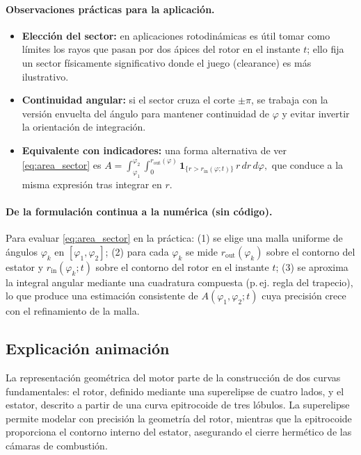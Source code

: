 \documentclass{LS}
\begin{document}
\paragraph{Observaciones prácticas para la aplicación.}
\begin{itemize}
  \item \textbf{Elección del sector:} en aplicaciones rotodinámicas es útil tomar como límites los rayos que pasan por dos ápices del rotor en el instante $t$; ello fija un sector físicamente significativo donde el juego (clearance) es más ilustrativo.
  \item \textbf{Continuidad angular:} si el sector cruza el corte $\pm\pi$, se trabaja con la versión envuelta del ángulo para mantener continuidad de $\varphi$ y evitar invertir la orientación de integración.
  \item \textbf{Equivalente con indicadores:} una forma alternativa de ver \eqref{eq:area_sector} es
  \(
  A=\int_{\varphi_1}^{\varphi_2}\!\int_{0}^{r_{\mathrm{out}}(\varphi)}
  \mathbf 1_{\{r>r_{\mathrm{in}}(\varphi;t)\}}\, r\,dr\,d\varphi,
  \)
  que conduce a la misma expresión tras integrar en $r$.
\end{itemize}

\paragraph{De la formulación continua a la numérica (sin código).}
Para evaluar \eqref{eq:area_sector} en la práctica:
(1) se elige una malla uniforme de ángulos $\varphi_k$ en $[\varphi_1,\varphi_2]$;
(2) para cada $\varphi_k$ se mide $r_{\mathrm{out}}(\varphi_k)$ sobre el contorno del estator
y $r_{\mathrm{in}}(\varphi_k;t)$ sobre el contorno del rotor en el instante $t$;
(3) se aproxima la integral angular mediante una cuadratura compuesta (p.\,ej. regla del trapecio),
lo que produce una estimación consistente de $A(\varphi_1,\varphi_2;t)$ cuya precisión crece con el refinamiento de la malla.

\subsection{Explicación animación}
La representación geométrica del motor parte de la construcción de dos curvas fundamentales: el rotor, definido mediante una superelipse de cuatro lados, y el estator, descrito a partir de una curva epitrocoide de tres lóbulos. La superelipse permite modelar con precisión la geometría del rotor, mientras que la epitrocoide proporciona el contorno interno del estator, asegurando el cierre hermético de las cámaras de combustión.
\end{document}
